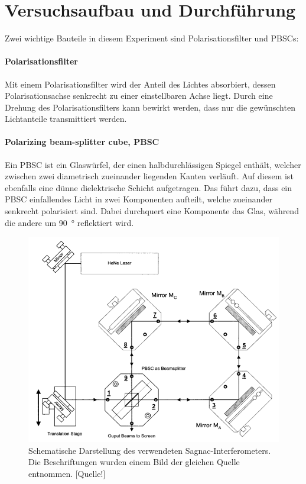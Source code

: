 

\section{Versuchsaufbau und Durchführung}
Zwei wichtige Bauteile in diesem Experiment sind Polarisationsfilter und PBSCs:

\paragraph{Polarisationsfilter}
Mit einem Polarisationsfilter wird der Anteil des Lichtes absorbiert, dessen Polarisationsachse senkrecht zu einer einstellbaren Achse liegt. Durch eine Drehung des Polarisationsfilters kann bewirkt werden, dass nur die gewünschten Lichtanteile transmittiert werden.

\paragraph{Polarizing beam-splitter cube, PBSC}
Ein PBSC ist ein Glaswürfel, der einen halbdurchlässigen Spiegel enthält, welcher zwischen zwei diametrisch zueinander liegenden Kanten verläuft. Auf diesem ist ebenfalls eine dünne dielektrische Schicht aufgetragen. Das führt dazu, dass ein PBSC einfallendes Licht in zwei Komponenten aufteilt, welche zueinander senkrecht polarisiert sind. Dabei durchquert eine Komponente das Glas, während die andere um \SI{90}{\degree} reflektiert wird.



\begin{figure}
\centering
\includegraphics[width=0.7\linewidth]{img/aufbau.png}
\caption{Schematische Darstellung des verwendeten Sagnac-Interferometers. Die Beschriftungen wurden einem Bild der gleichen Quelle entnommen. [Quelle!]}
\label{fig:aufbau}
\end{figure}

